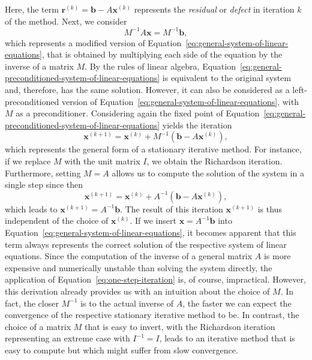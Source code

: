 Here, the term $\bm{r}^{(k)} = \bm{b} - A \bm{x}^{(k)}$ represents the \emph{residual} or \emph{defect} in iteration $k$ of the method.
Next, we consider 
\begin{equation}
	M^{-1} A \bm{x} = M^{-1} \bm{b},
	\label{eq:general-preconditioned-system-of-linear-equations}
\end{equation}
which represents a modified version of Equation~\eqref{eq:general-system-of-linear-equations}, that is obtained by multiplying each side of the equation by the inverse of a matrix $M$.
By the rules of linear algebra, Equation~\eqref{eq:general-preconditioned-system-of-linear-equations} is equivalent to the original system and, therefore, has the same solution.
However, it can also be considered as a left-preconditioned version of Equation~\eqref{eq:general-system-of-linear-equations}, with $M$ as a preconditioner.
Considering again the fixed point of Equation~\eqref{eq:general-preconditioned-system-of-linear-equations} yields the iteration
\begin{equation}
	\bm{x}^{(k+1)} = \bm{x}^{(k)} + M^{-1}(\bm b - A \bm{x}^{(k)}),
	\label{eq:general-stationary-iterative-method}
\end{equation}
which represents the general form of a stationary iterative method. 
For instance, if we replace $M$ with the unit matrix $I$, we obtain the Richardson iteration.
Furthermore, setting $M = A$ allows us to compute the solution of the system in a single step since then
\begin{equation}
	\bm{x}^{(k+1)} = \bm{x}^{(k)} + A^{-1}(\bm b - A \bm{x}^{(k)}),
	\label{eq:one-step-iteration}
\end{equation}
which leads to $\bm{x}^{(k+1)} = A^{-1}\bm b$.
The result of this iteration $\bm{x}^{(k+1)}$ is thus independent of the choice of $\bm{x}^{(k)}$. 
If we insert $\bm{x} = A^{-1}\bm b$ into Equation~\eqref{eq:general-system-of-linear-equations}, it becomes apparent that this term always represents the correct solution of the respective system of linear equations.
Since the computation of the inverse of a general matrix $A$ is more expensive and numerically unstable than solving the system directly, the application of Equation~\eqref{eq:one-step-iteration} is, of course, impractical.
However, this derivation already provides us with an intuition about the choice of $M$.
In fact, the closer $M^{-1}$ is to the actual inverse of $A$, the faster we can expect the convergence of the respective stationary iterative method to be.
In contrast, the choice of a matrix $M$ that is easy to invert, with the Richardson iteration representing an extreme case with $I^{-1} = I$, leads to an iterative method that is easy to compute but which might suffer from slow convergence.
